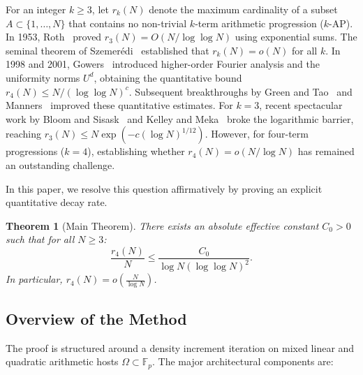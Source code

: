 \documentclass[11pt,reqno]{amsart}
\theoremstyle{plain}
\newtheorem{theorem}{Theorem}[section]
\theoremstyle{definition}
\newcommand{\F}{\mathbb{F}}
\begin{document}
For an integer $k \ge 3$, let $r_k(N)$ denote the maximum cardinality of a subset $A \subset \{1, \dots, N\}$ that contains no non-trivial $k$-term arithmetic progression ($k$-AP).
In 1953, Roth~\cite{szemeredi1975sets} proved $r_3(N) = O(N / \log\log N)$ using exponential sums.
The seminal theorem of Szemer\'edi~\cite{szemeredi1975sets} established that $r_k(N) = o(N)$ for all $k$.
In 1998 and 2001, Gowers~\cite{gowers1998new, gowers2001new} introduced higher-order Fourier analysis and the uniformity norms $U^d$, obtaining the quantitative bound $r_4(N) \le N / (\log\log N)^c$.
Subsequent breakthroughs by Green and Tao~\cite{green2017arithmetic} and Manners~\cite{manners2020quantitative} improved these quantitative estimates.
For $k = 3$, recent spectacular work by Bloom and Sisask~\cite{bloom2023breakthrough} and Kelley and Meka~\cite{kelleymeka2023strong} broke the logarithmic barrier, reaching $r_3(N) \le N \exp(-c (\log N)^{1/12})$.
However, for four-term progressions ($k = 4$), establishing whether $r_4(N) = o(N / \log N)$ has remained an outstanding challenge.

In this paper, we resolve this question affirmatively by proving an explicit quantitative decay rate.

\begin{theorem}[Main Theorem]\label{thm:main}
There exists an absolute effective constant $C_0 > 0$ such that for all $N \ge 3$:
\begin{equation}
\frac{r_4(N)}{N} \le \frac{C_0}{\log N (\log\log N)^2}.
\end{equation}
In particular, $r_4(N) = o\left( \frac{N}{\log N} \right)$.
\end{theorem}

\subsection{Overview of the Method}

The proof is structured around a density increment iteration on mixed linear and quadratic arithmetic hosts $\Omega \subset \F_p$.
The major architectural components are:
\end{document}
